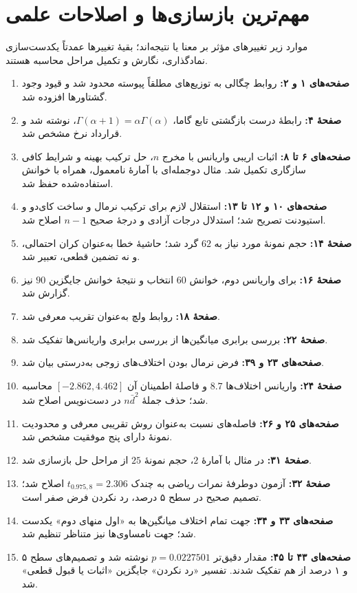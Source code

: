 \section{مهم‌ترین بازسازی‌ها و اصلاحات علمی}
موارد زیر تغییرهای مؤثر بر معنا یا نتیجه‌اند؛ بقیهٔ تغییرها عمدتاً یکدست‌سازی نمادگذاری، نگارش و تکمیل مراحل محاسبه هستند.
\begin{enumerate}
\item \textbf{صفحه‌های ۱ و ۲:} روابط چگالی به توزیع‌های مطلقاً پیوسته محدود شد و قیود وجود گشتاورها افزوده شد.
\item \textbf{صفحهٔ ۴:} رابطهٔ درست بازگشتی تابع گاما، $\Gamma(\alpha+1)=\alpha\Gamma(\alpha)$، نوشته شد و قرارداد نرخ مشخص شد.
\item \textbf{صفحه‌های ۶ تا ۸:} اثبات اریبی واریانس با مخرج $n$، حل ترکیب بهینه و شرایط کافی سازگاری تکمیل شد. مثال دوجمله‌ای با آمارهٔ نامعمول، همراه با خوانش استفاده‌شده حفظ شد.
\item \textbf{صفحه‌های ۱۰ و ۱۲ تا ۱۳:} استقلال لازم برای ترکیب نرمال و ساخت کای‌دو و استیودنت تصریح شد؛ استدلال درجات آزادی و درجهٔ صحیح $n-1$ اصلاح شد.
\item \textbf{صفحهٔ ۱۴:} حجم نمونهٔ مورد نیاز به $62$ گرد شد؛ حاشیهٔ خطا به‌عنوان کران احتمالی، و نه تضمین قطعی، تعبیر شد.
\item \textbf{صفحهٔ ۱۶:} برای واریانس دوم، خوانش $60$ انتخاب و نتیجهٔ خوانش جایگزین $90$ نیز گزارش شد.
\item \textbf{صفحهٔ ۱۸:} روابط ولچ به‌عنوان تقریب معرفی شد.
\item \textbf{صفحهٔ ۲۲:} بررسی برابری میانگین‌ها از بررسی برابری واریانس‌ها تفکیک شد.
\item \textbf{صفحه‌های ۲۳ و ۳۹:} فرض نرمال بودن اختلاف‌های زوجی به‌درستی بیان شد.
\item \textbf{صفحهٔ ۲۴:} واریانس اختلاف‌ها $8.7$ و فاصلهٔ اطمینان آن $[-2.862,4.462]$ محاسبه شد؛ حذف جملهٔ $n\bar d^2$ در دست‌نویس اصلاح شد.
\item \textbf{صفحه‌های ۲۵ و ۲۶:} فاصله‌های نسبت به‌عنوان روش تقریبی معرفی و محدودیت نمونهٔ دارای پنج موفقیت مشخص شد.
\item \textbf{صفحهٔ ۳۱:} در مثال با آمارهٔ $2$، حجم نمونهٔ $25$ از مراحل حل بازسازی شد.
\item \textbf{صفحهٔ ۳۲:} آزمون دوطرفهٔ نمرات ریاضی به چندک $t_{0.975,8}=2.306$ اصلاح شد؛ تصمیم صحیح در سطح ۵ درصد، رد نکردن فرض صفر است.
\item \textbf{صفحه‌های ۳۳ و ۳۴:} جهت تمام اختلاف میانگین‌ها به «اول منهای دوم» یکدست شد؛ جهت نامساوی‌ها نیز متناظر تنظیم شد.
\item \textbf{صفحه‌های ۴۳ تا ۴۵:} مقدار دقیق‌تر $p=0.0227501$ نوشته شد و تصمیم‌های سطح ۵ و ۱ درصد از هم تفکیک شدند. تفسیر «رد نکردن» جایگزین «اثبات یا قبول قطعی» شد.
\end{enumerate}

